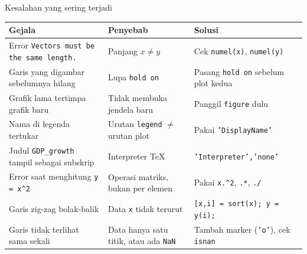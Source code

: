 \documentclass[10pt,aspectratio=169]{beamer}
\newcommand{\kd}[1]{\texttt{#1}}
\begin{document}
\begin{frame}{Kesalahan yang sering terjadi}
\footnotesize
\begin{tabular}{@{}>{\raggedright\arraybackslash}p{}>{\raggedright\arraybackslash}p{}>{\raggedright\arraybackslash}p{}@{}}
\toprule
Gejala & Penyebab & Solusi\\
\midrule
Error \kd{Vectors must be the same length.} & Panjang $x \neq y$ & Cek \kd{numel(x)}, \kd{numel(y)}\\
Garis yang digambar sebelumnya hilang & Lupa \kd{hold on} & Pasang \kd{hold on} sebelum plot kedua\\
Grafik lama tertimpa grafik baru & Tidak membuka jendela baru & Panggil \kd{figure} dulu\\
Nama di legenda tertukar & Urutan \kd{legend} $\neq$ urutan plot & Pakai \kd{'DisplayName'}\\
Judul \kd{GDP\_growth} tampil sebagai subskrip & Interpreter \TeX & \kd{'Interpreter','none'}\\
Error saat menghitung \kd{y = x\textasciicircum 2} & Operasi matriks, bukan per elemen & Pakai \kd{x.\textasciicircum 2}, \kd{.*}, \kd{./}\\
Garis zig-zag bolak-balik & Data \kd{x} tidak terurut & \kd{[x,i] = sort(x); y = y(i);}\\
Garis tidak terlihat sama sekali & Data hanya satu titik, atau ada \kd{NaN} & Tambah marker (\kd{'o'}), cek \kd{isnan}\\
\bottomrule
\end{tabular}
\end{frame}
\end{document}

